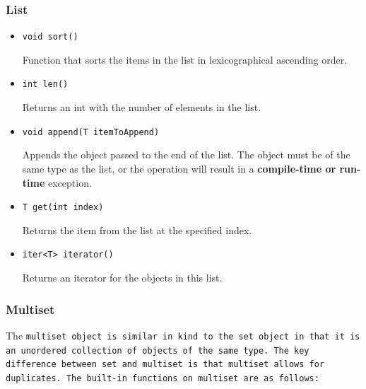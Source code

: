 \documentclass{article}
\begin{document}

\subsubsection{List} %
\label{ssub:list}

\begin{itemize}

\item[] \tt void sort() \rm

Function that sorts the items in the list in lexicographical ascending order.

\item[] \tt int len() \rm

Returns an int with the number of elements in the list.

\item[] \tt void append(T itemToAppend) \rm

Appends the object passed to the end of the list. The object must be of the same
type as the list, or the operation will result in a \textbf{compile-time or
run-time} exception.

\item[] \tt T get(int index) \rm

Returns the item from the list at the specified index.

\item[] \tt iter<T> iterator() \rm

Returns an iterator for the objects in this list.

\end{itemize}



\subsubsection{Multiset} %
\label{ssub:multiset}

The \tt multiset \rm object is similar in kind to the \tt set \rm object in that
it is an unordered collection of objects of the same type. The key difference
between \tt set \rm and \tt multiset \rm is that \tt multiset \rm allows for
duplicates. The built-in functions on \tt multiset \rm are as follows:
\end{document}
